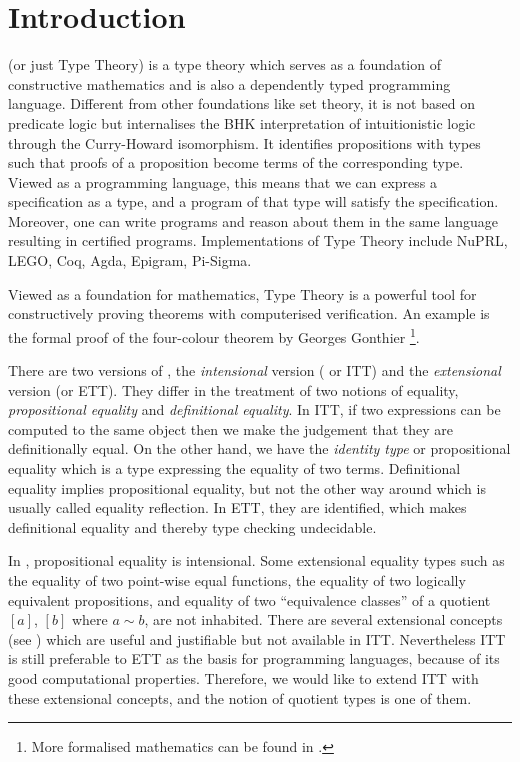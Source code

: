 \chapter{Introduction}

\mltt (or just Type Theory) is a type theory which serves as a
foundation of constructive mathematics and is also a dependently typed
programming language. Different from other foundations like set
theory, it is not based on predicate logic but internalises the BHK
interpretation of intuitionistic logic through the Curry-Howard
isomorphism. It identifies propositions with types such that proofs of
a proposition become terms of the corresponding type. Viewed as a
programming language, this means that we can express a specification
as a type, and a program of that type will satisfy the
specification. Moreover, one can write programs and reason about them
in the same language resulting in certified programs. Implementations
of Type Theory include NuPRL, LEGO, Coq, Agda, Epigram, Pi-Sigma.


Viewed as a foundation for mathematics, Type Theory is a powerful tool
for constructively proving theorems with computerised verification. An
example is the formal proof of the four-colour theorem by Georges
Gonthier \cite{gonthier08ams} \footnote{More formalised mathematics
  can be found in \cite{sbfm}.}.

There are two versions of \mltt, the \emph{intensional} version (\itt
or ITT) and the \emph{extensional} version (\ett or ETT).  They differ
in the treatment of two notions of equality, \emph{propositional
  equality} and \emph{definitional equality}.  In ITT, if two
expressions can be computed to the same object then we make the
judgement that they are definitionally equal. On the other hand, we
have the \emph{identity type} or propositional equality which is a
type expressing the equality of two terms. Definitional equality
implies propositional equality, but not the other way around which is
usually called equality reflection. In ETT, they are identified, which
makes definitional equality and thereby type checking undecidable.


In \itt, propositional equality is intensional. Some extensional
equality types such as the equality of two point-wise equal functions,
the equality of two logically equivalent propositions, and equality of
two ``equivalence classes'' of a quotient $[a]$, $[b]$ where $a \sim
b$, are not inhabited. There are several extensional concepts (see
) which are useful and justifiable but not
available in ITT.  Nevertheless ITT is still preferable to ETT as the
basis for programming languages, because of its good computational
properties.  Therefore, we would like to extend ITT with these
extensional concepts, and the notion of quotient types is one of them.

